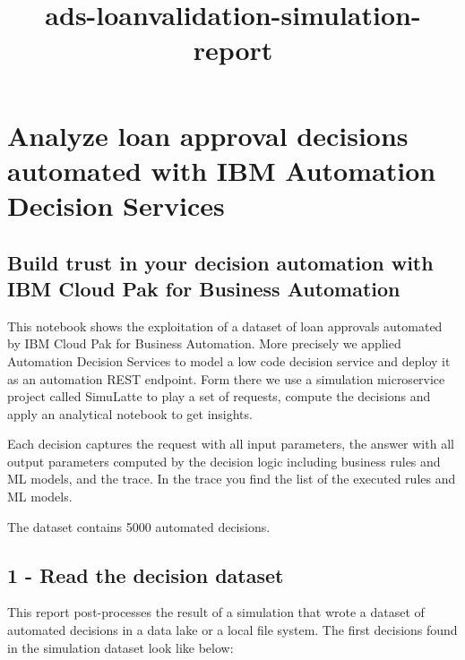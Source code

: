 \documentclass[11pt]{article}
\title{ads-loanvalidation-simulation-report}
\begin{document}
    
    \maketitle
    
    

    
    \hypertarget{analyze-loan-approval-decisions-automated-with-ibm-automation-decision-services}{%
\section{Analyze loan approval decisions automated with IBM Automation
Decision
Services}\label{analyze-loan-approval-decisions-automated-with-ibm-automation-decision-services}}

\hypertarget{build-trust-in-your-decision-automation-with-ibm-cloud-pak-for-business-automation}{%
\subsection{Build trust in your decision automation with IBM Cloud Pak
for Business
Automation}\label{build-trust-in-your-decision-automation-with-ibm-cloud-pak-for-business-automation}}

This notebook shows the exploitation of a dataset of loan approvals
automated by IBM Cloud Pak for Business Automation. More precisely we
applied Automation Decision Services to model a low code decision
service and deploy it as an automation REST endpoint. Form there we use
a simulation microservice project called SimuLatte to play a set of
requests, compute the decisions and apply an analytical notebook to get
insights.

Each decision captures the request with all input parameters, the answer
with all output parameters computed by the decision logic including
business rules and ML models, and the trace. In the trace you find the
list of the executed rules and ML models.

The dataset contains 5000 automated decisions.

    \hypertarget{read-the-decision-dataset}{%
\subsection{1 - Read the decision
dataset}\label{read-the-decision-dataset}}

This report post-processes the result of a simulation that wrote a
dataset of automated decisions in a data lake or a local file system.
The first decisions found in the simulation dataset look like below:
\end{document}
